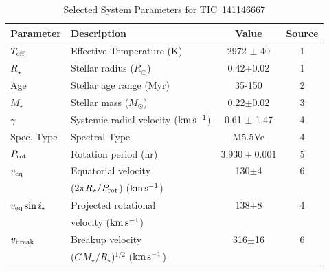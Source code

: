 \documentclass{nature3}
\newcommand{\kms}{\ensuremath{\rm km\,s^{-1}}}
\begin{document}
\begin{table}
\small
\setlength{\tabcolsep}{2pt}
\centering
\caption{Selected System Parameters for TIC~141146667}
\label{tab:params}
\begin{tabular}{llcc}
\hline \hline
Parameter & Description & Value & Source\\
\hline 
%
$T_{\rm eff}$\dotfill                   & Effective Temperature (K) \hspace{9pt}\dotfill                 & 2972 $\pm$ 40    & 1 \\
%
$R_\star$\dotfill                       & Stellar radius ($R_\odot$)\dotfill                             & 0.42$\pm$0.02    & 1 \\
%
Age                                     & Stellar age range (Myr)\dotfill                                & 35-150           & 2 \\
%
$M_\star$\dotfill                       & Stellar mass ($M_\odot$)\dotfill                               & 0.22$\pm$0.02    & 3 \\
%
$\gamma$\dotfill                        & Systemic radial velocity (\kms)\dotfill                        & 0.61 $\pm$ 1.47  & 4 \\
%
Spec. Type\dotfill                      & Spectral Type\dotfill                                          & M5.5Ve           & 4 \\
%
$P_{\rm rot}$\dotfill                   & Rotation period (hr)\dotfill                                   & $3.930\pm 0.001$ & 5 \\
%
$v_{\rm eq}$\dotfill		                & Equatorial velocity \dotfill                                   &  130$\pm$4       & 6 \\
                                        & \hspace{3pt} ($2\pi R_\star/P_{\rm rot}$) (\kms)	             &                      \\
%
$v_{\rm eq}\sin{i_\star}$\dotfill		    & Projected rotational\dotfill                                   &  138$\pm$8       & 4 \\
                                        & \hspace{3pt} velocity (\kms)	                                 &                      \\
%
$v_{\rm break}$\dotfill		              & Breakup velocity \dotfill                                      &  316$\pm$16      & 6 \\
                                        & \hspace{3pt} ($G M_\star / R_\star$)$^{1/2}$ (\kms)	           &                      \\

\end{tabular}
\end{table}
\end{document}
